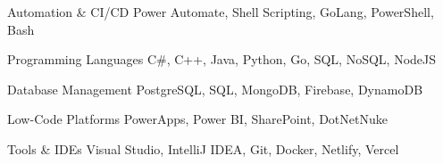 
\begin{cvskills}

  \cvskill
    {Automation \& CI/CD} %
    {Power Automate, Shell Scripting, GoLang, PowerShell, Bash} %

  \cvskill
    {Programming Languages} %
    {C\#, C++, Java, Python, Go, SQL, NoSQL, NodeJS} %

  \cvskill
    {Database Management} %
    {PostgreSQL, SQL, MongoDB, Firebase, DynamoDB} %

  \cvskill
    {Low-Code Platforms} %
    {PowerApps, Power BI, SharePoint, DotNetNuke} %

  \cvskill
    {Tools \& IDEs} %
    {Visual Studio, IntelliJ IDEA, Git, Docker, Netlify, Vercel} %

\end{cvskills}
